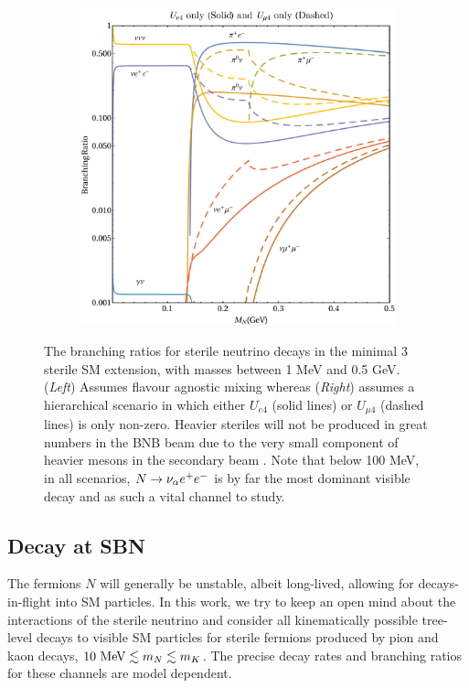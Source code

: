 \documentclass[11pt, a4paper]{article}
\def\ster{\ensuremath N}
\begin{document}
\begin{figure}[t]
\begin{subfigure}{.5\textwidth}
\includegraphics[width=\linewidth]{figures/BR_notlog_square2.pdf}
\end{subfigure}

\caption{\label{fig:branchingratios}The branching ratios for sterile neutrino
decays in the minimal 3 sterile SM extension, with masses between 1 MeV and 0.5
GeV. (\emph{Left}) Assumes flavour agnostic mixing whereas (\emph{Right}) assumes a
hierarchical scenario in which either $U_{e4}$ (solid lines) or $U_{\mu 4}$
(dashed lines) is only non-zero. Heavier steriles will not be produced in great
numbers in the BNB beam due to the very small component of heavier mesons in
the secondary beam \cite{AguilarArevalo:2008yp}. Note that below 100 MeV, in
all scenarios, $\ster \rightarrow \nu_\alpha e^+ e^-$ is by far the most
dominant visible decay and as such a vital channel to study.}

\end{figure}
%

\subsection{Decay at SBN}

The fermions $N$ will generally be unstable, albeit long-lived, allowing
for decays-in-flight into SM particles. In this work, we try to keep an open
mind about the interactions of the sterile neutrino and consider all
kinematically possible tree-level decays to visible SM particles for sterile
fermions produced by pion and kaon decays, $10~\text{MeV}\lesssim m_{\ster}
\lesssim m_K$. The precise decay rates and branching ratios for these channels
are model dependent. 
%
\end{document}
